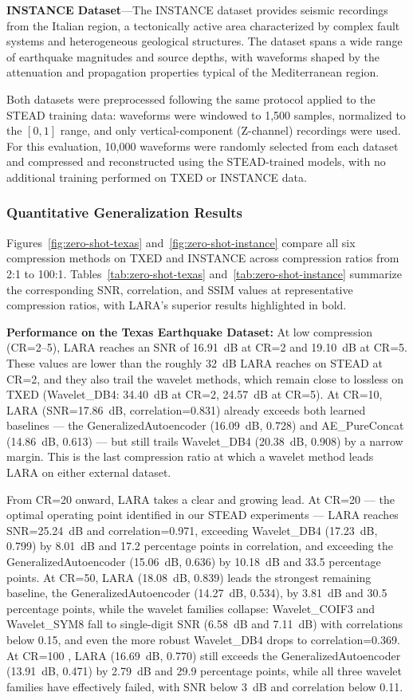 \documentclass[fleqn,10pt]{wlscirep}
\begin{document}
\textbf{INSTANCE Dataset}---The INSTANCE dataset \cite{michelini2021instance} provides seismic recordings from the Italian region, a tectonically active area characterized by complex fault systems and heterogeneous geological structures. The dataset spans a wide range of earthquake magnitudes and source depths, with waveforms shaped by the attenuation and propagation properties typical of the Mediterranean region.

Both datasets were preprocessed following the same protocol applied to the STEAD training data: waveforms were windowed to 1,500 samples, normalized to the $[0,1]$ range, and only vertical-component (Z-channel) recordings were used. For this evaluation, 10,000 waveforms were randomly selected from each dataset and compressed and reconstructed using the STEAD-trained models, with no additional training performed on TXED or INSTANCE data. 

\subsubsection{Quantitative Generalization Results}

Figures~\ref{fig:zero-shot-texas} and~\ref{fig:zero-shot-instance} compare all six compression methods on TXED and INSTANCE across compression ratios from 2:1 to 100:1. Tables~\ref{tab:zero-shot-texas} and~\ref{tab:zero-shot-instance} summarize the corresponding SNR, correlation, and SSIM values at representative compression ratios, with LARA's superior results highlighted in bold.

\textbf{Performance on the Texas Earthquake Dataset:} At low compression (CR=2--5), LARA reaches an SNR of 16.91~dB at CR=2 and 19.10~dB at CR=5. These values are lower than the roughly 32~dB LARA reaches on STEAD at CR=2, and they also trail the wavelet methods, which remain close to lossless on TXED (Wavelet\_DB4: 34.40~dB at CR=2, 24.57~dB at CR=5). At CR=10, LARA (SNR=17.86~dB, correlation=0.831) already exceeds both learned baselines --- the GeneralizedAutoencoder (16.09~dB, 0.728) and AE\_PureConcat (14.86~dB, 0.613) --- but still trails Wavelet\_DB4 (20.38~dB, 0.908) by a narrow margin. This is the last compression ratio at which a wavelet method leads LARA on either external dataset.

From CR=20 onward, LARA takes a clear and growing lead. At CR=20 --- the optimal operating point identified in our STEAD experiments --- LARA reaches SNR=25.24~dB and correlation=0.971, exceeding Wavelet\_DB4 (17.23~dB, 0.799) by 8.01~dB and 17.2 percentage points in correlation, and exceeding the GeneralizedAutoencoder (15.06~dB, 0.636) by 10.18~dB and 33.5 percentage points. At CR=50, LARA (18.08~dB, 0.839) leads the strongest remaining baseline, the GeneralizedAutoencoder (14.27~dB, 0.534), by 3.81~dB and 30.5 percentage points, while the wavelet families collapse: Wavelet\_COIF3 and Wavelet\_SYM8 fall to single-digit SNR (6.58~dB and 7.11~dB) with correlations below 0.15, and even the more robust Wavelet\_DB4 drops to correlation=0.369. At CR=100 , LARA (16.69~dB, 0.770) still exceeds the GeneralizedAutoencoder (13.91~dB, 0.471) by 2.79~dB and 29.9 percentage points, while all three wavelet families have effectively failed, with SNR below 3~dB and correlation below 0.11.
\end{document}
